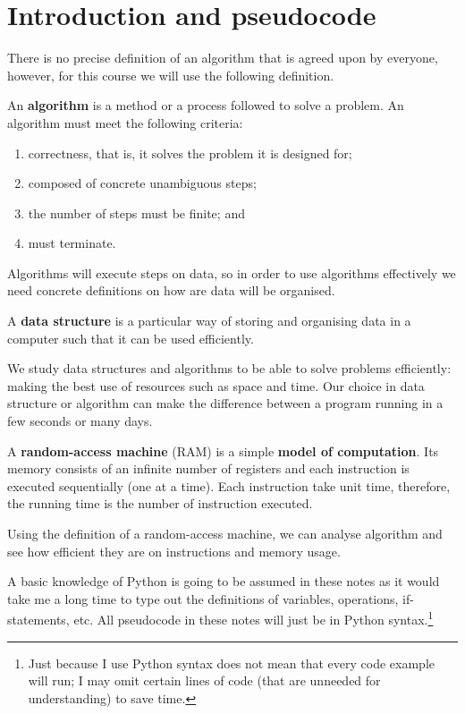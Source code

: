 \chapter{Introduction and pseudocode}

There is no precise definition of an algorithm that is agreed upon by everyone, however, for this course we will use the following definition.

\begin{definition}
    An \textbf{algorithm} is a method or a process followed to solve a problem. An algorithm must meet the following criteria:
    \begin{enumerate}
        \item correctness, that is, it solves the problem it is designed for;
        \item composed of concrete unambiguous steps;
        \item the number of steps must be finite; and
        \item must terminate.
    \end{enumerate}
\end{definition}

Algorithms will execute steps on data, so in order to use algorithms effectively we need concrete definitions on how are data will be organised.

\begin{definition}
    A \textbf{data structure} is a particular way of storing and organising data in a computer such that it can be used efficiently.
\end{definition}

We study data structures and algorithms to be able to solve problems efficiently: making the best use of resources such as space and time. Our choice in data structure or algorithm can make the difference between a program running in a few seconds or many days.

\begin{definition}
    A \textbf{random-access machine} (RAM) is a simple \textbf{model of computation}. Its memory consists of an infinite number of registers and each instruction is executed sequentially (one at a time). Each instruction take unit time, therefore, the running time is the number of instruction executed.
\end{definition}

Using the definition of a random-access machine, we can analyse algorithm and see how efficient they are on instructions and memory usage.

A basic knowledge of Python is going to be assumed in these notes as it would take me a long time to type out the definitions of variables, operations, if-statements, etc. All pseudocode in these notes will just be in Python syntax.\footnote{Just because I use Python syntax does not mean that every code example will run; I may omit certain lines of code (that are unneeded for understanding) to save time.}
